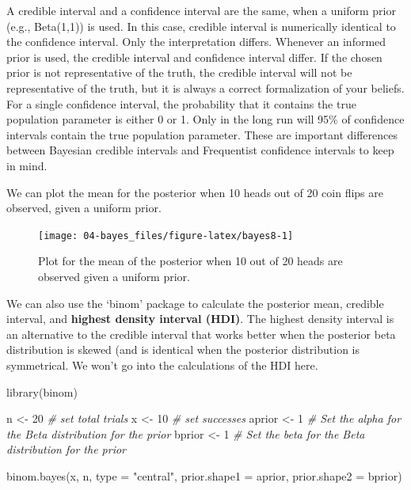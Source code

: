 \documentclass[
  oneside]{krantz}
\makeatletter
\newenvironment{Shaded}{\begin{snugshade}}{\end{snugshade}}
\newcommand{\AttributeTok}[1]{\textcolor[rgb]{0.61,0.61,0.61}{#1}}
\newcommand{\CommentTok}[1]{\textcolor[rgb]{0.37,0.37,0.37}{\textit{#1}}}
\newcommand{\DecValTok}[1]{\textcolor[rgb]{0.06,0.06,0.06}{#1}}
\newcommand{\FunctionTok}[1]{\textcolor[rgb]{0,0,0}{#1}}
\newcommand{\NormalTok}[1]{#1}
\newcommand{\OtherTok}[1]{\textcolor[rgb]{0.37,0.37,0.37}{#1}}
\newcommand{\StringTok}[1]{\textcolor[rgb]{0.5,0.5,0.5}{#1}}
\newenvironment{kframe}{%
\medskip{}
\setlength{\fboxsep}{.8em}
 \def\at@end@of@kframe{}%
 \ifinner\ifhmode%
  \def\at@end@of@kframe{\end{minipage}}%
  \begin{minipage}{\columnwidth}%
 \fi\fi%
 \def\FrameCommand##1{\hskip\@totalleftmargin \hskip-\fboxsep
 \colorbox{shadecolor}{##1}\hskip-\fboxsep
     \hskip-\linewidth \hskip-\@totalleftmargin \hskip\columnwidth}%
 \MakeFramed {\advance\hsize-\width
   \@totalleftmargin\z@ \linewidth\hsize
   \@setminipage}}%
 {\par\unskip\endMakeFramed%
 \at@end@of@kframe}
\renewenvironment{Shaded}{\begin{kframe}}{\end{kframe}}
\makeatother
\begin{document}
A credible interval and a confidence interval are the same, when a uniform prior (e.g., Beta(1,1)) is used. In this case, credible interval is numerically identical to the confidence interval. Only the interpretation differs. Whenever an informed prior is used, the credible interval and confidence interval differ. If the chosen prior is not representative of the truth, the credible interval will not be representative of the truth, but it is always a correct formalization of your beliefs. For a single confidence interval, the probability that it contains the true population parameter is either 0 or 1. Only in the long run will 95\% of confidence intervals contain the true population parameter. These are important differences between Bayesian credible intervals and Frequentist confidence intervals to keep in mind.

We can plot the mean for the posterior when 10 heads out of 20 coin flips are observed, given a uniform prior.



\begin{figure}

{\centering \texttt{[image: 04-bayes\_files/figure-latex/bayes8-1]} 

}

\caption{Plot for the mean of the posterior when 10 out of 20 heads are observed given a uniform prior.}\label{fig:bayes8}
\end{figure}

We can also use the `binom' package to calculate the posterior mean, credible interval, and \textbf{highest density interval (HDI)}. The highest density interval is an alternative to the credible interval that works better when the posterior beta distribution is skewed (and is identical when the posterior distribution is symmetrical. We won't go into the calculations of the HDI here.

\begin{Shaded}
\begin{Highlighting}[]
\FunctionTok{library}\NormalTok{(binom)}

\NormalTok{n }\OtherTok{\textless{}{-}} \DecValTok{20} \CommentTok{\# set total trials}
\NormalTok{x }\OtherTok{\textless{}{-}} \DecValTok{10} \CommentTok{\# set successes}
\NormalTok{aprior }\OtherTok{\textless{}{-}} \DecValTok{1} \CommentTok{\# Set the alpha for the Beta distribution for the prior}
\NormalTok{bprior }\OtherTok{\textless{}{-}} \DecValTok{1} \CommentTok{\# Set the beta for the Beta distribution for the prior}

\FunctionTok{binom.bayes}\NormalTok{(x, n, }\AttributeTok{type =} \StringTok{"central"}\NormalTok{, }\AttributeTok{prior.shape1 =}\NormalTok{ aprior, }\AttributeTok{prior.shape2 =}\NormalTok{ bprior)}
\end{Highlighting}
\end{Shaded}
\end{document}
